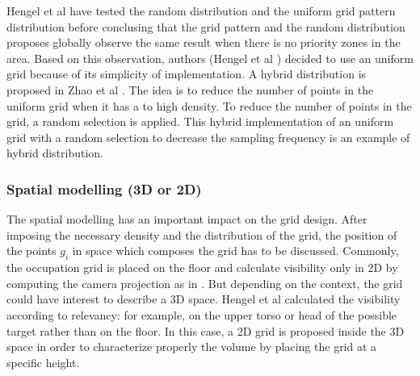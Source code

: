 Hengel et al \cite{83*van2009} have tested the random distribution and the uniform grid pattern distribution before conclusing that the grid pattern and the random distribution proposes globally observe the same result when there is no priority zones in the area. Based on this observation, authors (Hengel et al \cite{83*van2009}) decided to use an uniform grid because of its simplicity of implementation.
A  hybrid distribution is proposed in  Zhao et al \cite{22*zhao2008}.
The idea is to reduce the number of points in the uniform grid when it has a to high density. To reduce the number of points in the grid, a random selection is applied. This hybrid implementation of an uniform grid with a random selection to decrease the sampling frequency is an example of hybrid distribution.


\subsubsection{Spatial modelling (3D or 2D)}
 The spatial modelling has an important impact on the grid design. After imposing the necessary density and the distribution of the grid, the position of the points $g_i$  in space which composes the grid  has to be discussed.  
  Commonly, the occupation grid is placed on the floor and calculate visibility only in 2D  by computing the  camera projection as in  \citep{164*valente2013,150*chakrabarty2002,8*zhou2011,170*yabuta2008,171*horster2006,22*zhao2008}. But depending on the context, the grid could have interest to describe a 3D space.  
Hengel et al \cite{83*van2009} calculated the visibility according to relevancy: for example, on the upper torso or head of the possible target rather than on the floor. In this case, a 2D grid is proposed inside the 3D space in order to  characterize properly the volume by placing the grid at a specific height.  

